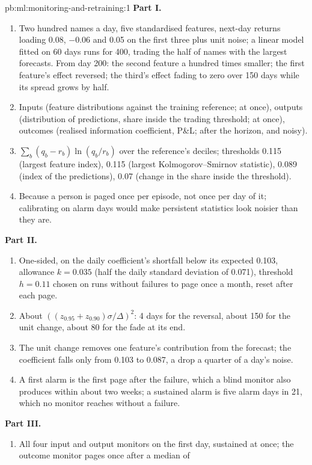 \begin{solution}{pb:ml:monitoring-and-retraining:1}
\textbf{Part I.}
\begin{enumerate}
\item Two hundred names a day, five standardised features, next-day returns loading 0.08, $-0.06$ and 0.05 on the first three
plus unit noise; a linear model fitted on 60 days runs for 400, trading the half of names with the largest forecasts. From day
200: the second feature a hundred times smaller; the first feature's effect reversed; the third's effect fading to zero over 150
days while its spread grows by half.
\item Inputs (feature distributions against the training reference; at once), outputs (distribution of predictions, share inside
the trading threshold; at once), outcomes (realised information coefficient, P\&L; after the horizon, and noisy).
\item $\sum_b(q_b-r_b)\ln(q_b/r_b)$ over the reference's deciles; thresholds 0.115 (largest feature index), 0.115 (largest
Kolmogorov--Smirnov statistic), 0.089 (index of the predictions), 0.07 (change in the share inside the threshold).
\item Because a person is paged once per episode, not once per day of it; calibrating on alarm days would make persistent
statistics look noisier than they are.
\end{enumerate}
\textbf{Part II.}
\begin{enumerate}[resume]
\item One-sided, on the daily coefficient's shortfall below its expected 0.103, allowance $k=0.035$ (half the daily standard
deviation of 0.071), threshold $h=0.11$ chosen on runs without failures to page once a month, reset after each page.
\item About $((z_{0.95}+z_{0.90})\sigma/\Delta)^2$: 4 days for the reversal, about 150 for the unit change, about 80 for the fade at its
end.
\item The unit change removes one feature's contribution from the forecast; the coefficient falls only from 0.103 to 0.087, a
drop a quarter of a day's noise.
\item A first alarm is the first page after the failure, which a blind monitor also produces within about two weeks; a sustained
alarm is five alarm days in 21, which no monitor reaches without a failure.
\end{enumerate}
\textbf{Part III.}
\begin{enumerate}[resume]
\item All four input and output monitors on the first day, sustained at once; the outcome monitor pages once after a median of

\end{enumerate}
\end{solution}
